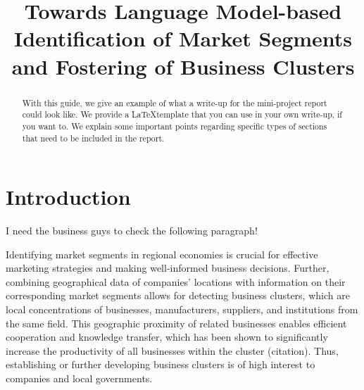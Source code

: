 \documentclass[conference]{IEEEtran}
\begin{document}
\title{Towards Language Model-based Identification of Market Segments and Fostering of Business Clusters}

\author{
\and
{}
\and
{}
\and
{}
\and
{}
}

\maketitle

\begin{abstract}
With this guide, we give an example of what a write-up for the mini-project report could look like. We provide a \LaTeX template that you 
can use in your own write-up, if you want to. We explain some important points regarding specific types of sections that need to be included in the report.
\end{abstract}


\section{Introduction}
\color{red} 
I need the business guys to check the following paragraph!
\color{black}

Identifying market segments in regional economies is crucial for effective marketing strategies and making well-informed business decisions. Further, combining geographical data of companies' locations with information on their corresponding market segments allows for detecting business clusters, which are local concentrations of businesses, manufacturers, suppliers, and institutions from the same field. This geographic proximity of related businesses enables efficient cooperation and knowledge transfer, which has been shown to significantly increase the productivity of all businesses within the cluster (citation). Thus, establishing or further developing business clusters is of high interest to companies and local governments.
\end{document}
